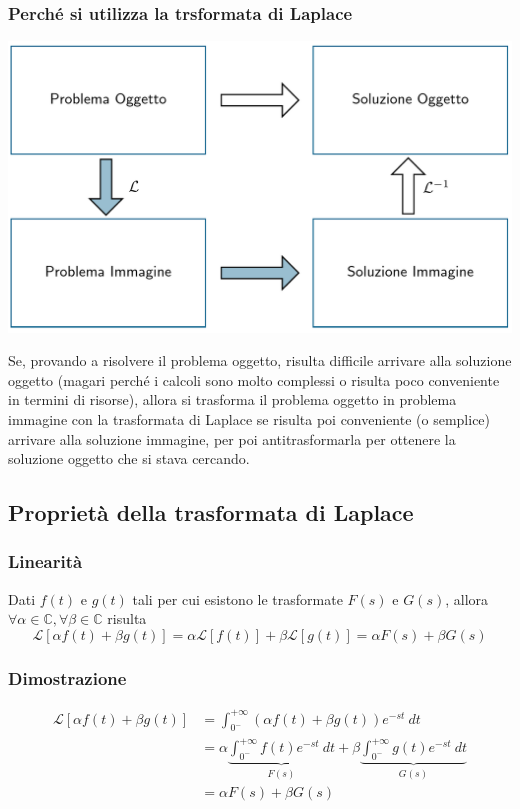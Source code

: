 \documentclass{article}
\numberwithin{equation}{subsection}
\let\oldsubsection\subsection%
\renewcommand{\subsection}{%
  \renewcommand{\theequation}{\thesubsection.\arabic{equation}}%
  \oldsubsection}%
\begin{document}
\subsubsection{Perché si utilizza la trsformata di Laplace}
\begin{center}
    \includegraphics[scale=0.18]{Images/Motivo_Laplace.png}
\end{center}
Se, provando a risolvere il problema oggetto, risulta difficile arrivare alla soluzione oggetto (magari perché i calcoli sono molto complessi o risulta poco conveniente in termini di risorse), allora si trasforma il problema oggetto in problema immagine con la trasformata di Laplace se risulta poi conveniente (o semplice) arrivare alla soluzione immagine, per poi antitrasformarla per ottenere la soluzione oggetto che si stava cercando.


\subsection{Proprietà della trasformata di Laplace}
\subsubsection{Linearità}
Dati $f(t)$ e $g(t)$ tali per cui esistono le trasformate $F(s)$ e $G(s)$, allora $\forall \alpha \in \mathbb{C}, \forall \beta \in \mathbb{C}$ risulta
\begin{equation}
    \mathcal{L}[\alpha f(t) + \beta g(t)] = \alpha \mathcal{L}[f(t)] + \beta \mathcal{L}[g(t)] = \alpha F(s) + \beta G(s)
\end{equation}

\subsubsection*{Dimostrazione}
\begin{align*}
    \mathcal{L}[\alpha f(t) + \beta g(t)] &= \int_{0^{-}}^{+\infty}\left(\alpha f(t) + \beta g(t)\right) e^{-st} \ dt\\
    &= \alpha \underbrace{\int_{0^{-}}^{+\infty} f(t)e^{-st} \ dt}_{F(s)} + \beta \underbrace{\int_{0^{-}}^{+\infty} g(t)e^{-st} \ dt}_{G(s)}\\
    &= \alpha F(s) + \beta G(s)
\end{align*}
\end{document}
